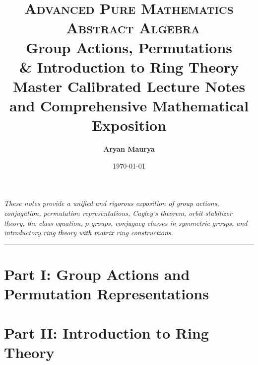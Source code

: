 \documentclass[11pt,a4paper]{article}
\title{
    \vspace{-1.5cm}
    {\normalsize\scshape\color{accentteal} Advanced Pure Mathematics \textbar\ Abstract Algebra}\\[0.4cm]
    {\Huge\bfseries\color{primary} Group Actions, Permutations \\ \& Introduction to Ring Theory}\\[0.3cm]
    {\large\color{darkgray} Master Calibrated Lecture Notes and Comprehensive Mathematical Exposition}
}
\author{\textbf{Aryan Maurya}}
\date{\today}
\begin{document}
\maketitle
\thispagestyle{empty}

\begin{center}
\begin{minipage}{0.92\textwidth}
\small\itshape
\centering
These notes provide a unified and rigorous exposition of group actions, conjugation, permutation representations, Cayley's theorem, orbit-stabilizer theory, the class equation, $p$-groups, conjugacy classes in symmetric groups, and introductory ring theory with matrix ring constructions.
\end{minipage}
\end{center}

\vspace{0.3cm}
\tableofcontents
\vspace{0.6cm}
\hrule
\vspace{0.8cm}

\newpage
{}

\part*{Part I: Group Actions and Permutation Representations}










\newpage
\part*{Part II: Introduction to Ring Theory}




\end{document}
